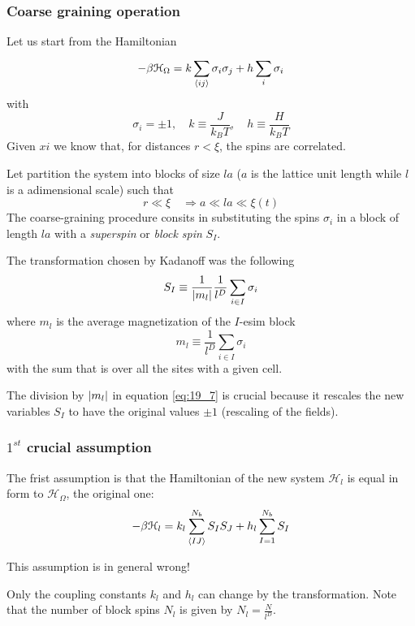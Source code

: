 \documentclass[../main/main.tex]{subfiles}
\begin{document}
\subsubsection{Coarse graining operation}
Let us start from the Hamiltonian
\begin{equation}
  - \beta \mathcal{H}_{\Omega } = k \sum_{\expval{ij} }^{} \sigma _i \sigma _j + h \sum_{i}^{} \sigma _i
\end{equation}
with
\begin{equation}
  \sigma _i = \pm 1, \quad k \equiv \frac{J}{k_B T}, \quad h \equiv \frac{H}{k_B T}
\end{equation}
Given \( xi \) we know that, for distances \( r < \xi  \), the spins are correlated.

Let partition the system into blocks of size \( la \) (\( a \) is the lattice unit length while \( l \) is a adimensional scale) such that
\begin{equation}
  r \ll \xi  \quad \Rightarrow a \ll l a \ll \xi (t)
\end{equation}
The coarse-graining procedure consits in substituting the spins \( \sigma _i \) in a block of length \( la \) with a \emph{superspin} or \emph{block spin} \( S_I \).

The transformation chosen by Kadanoff was the following
\begin{equation}
  S_I \equiv \frac{1}{\abs{m_l} } \frac{1}{l^D} \sum_{i \in I}^{}  \sigma _i
  \label{eq:19_7}
\end{equation}
where \( m_l \) is the average magnetization of the \( I \)-esim block
\begin{equation}
  m_l \equiv \frac{1}{l^D} \sum_{i \in I}^{} \sigma _i
\end{equation}
with the sum that is over all the sites with a given cell.
\begin{remark}
The division by \( \abs{m_l}  \) in equation \eqref{eq:19_7} is crucial because it rescales the new variables \( S_I \) to have the original values \( \pm 1 \) (rescaling of the fields).
\end{remark}

\subsubsection{\(  1^{st} \) crucial assumption}
The frist assumption is that the Hamiltonian of the new system \( \mathcal{H}_l \) is equal in form to \( \mathcal{H}_ \Omega  \), the original one:
\begin{equation}
  - \beta \mathcal{H}_l = k_l \sum_{\expval{IJ} }^{N_b} S_I S_J  + h_l \sum_{I=1}^{N_b} S_I
\end{equation}
\begin{remark}
This assumption is in general wrong!
\end{remark}
Only the coupling constants \( k_l \) and \( h_l \) can change by the transformation. Note that the number of block spins \( N_l \) is given by \(   N_l = \frac{N}{l^D} \).
\end{document}
